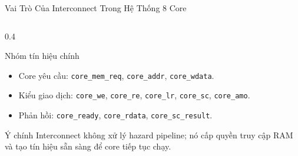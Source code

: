 \begin{frame}{Vai Trò Của Interconnect Trong Hệ Thống 8 Core}
\begin{columns}[T]
        \begin{column}{0.4\textwidth}
            \begin{block}{Nhóm tín hiệu chính}
                \scriptsize
                \begin{itemize}
                    \item Core yêu cầu: \texttt{core\_mem\_req}, \texttt{core\_addr}, \texttt{core\_wdata}.
                    \item Kiểu giao dịch: \texttt{core\_we}, \texttt{core\_re}, \texttt{core\_lr}, \texttt{core\_sc}, \texttt{core\_amo}.
                    \item Phản hồi: \texttt{core\_ready}, \texttt{core\_rdata}, \texttt{core\_sc\_result}.
                \end{itemize}
            \end{block}
            \begin{alertblock}{Ý chính}
                \scriptsize
                Interconnect không xử lý hazard pipeline; nó cấp quyền truy cập RAM và tạo tín hiệu sẵn sàng để core tiếp tục chạy.
            \end{alertblock}
        \end{column}
    \end{columns}
\end{frame}

